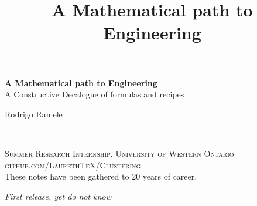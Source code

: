\documentclass[11pt,fleqn]{book} %
\begin{document}
\title{A Mathematical path to Engineering}


\begingroup
\thispagestyle{empty}
\centering
\vspace*{5cm}
\par\normalfont\fontsize{35}{35}\sffamily\selectfont
\textbf{A Mathematical path to Engineering}\\
{\LARGE A Constructive Decalogue of formulas and recipes}\par %
\vspace*{1cm}
{\Huge Rodrigo Ramele}\par %
\endgroup


\newpage
~\vfill
\thispagestyle{empty}


\noindent \textsc{Summer Research Internship, University of Western Ontario}\\

\noindent \textsc{github.com/LaurethTeX/Clustering}\\ %

\noindent These notes have been gathered to 20 years of career.

\noindent \textit{First release, yet do not know} %



\pagestyle{empty} %

\tableofcontents %

\end{document}

